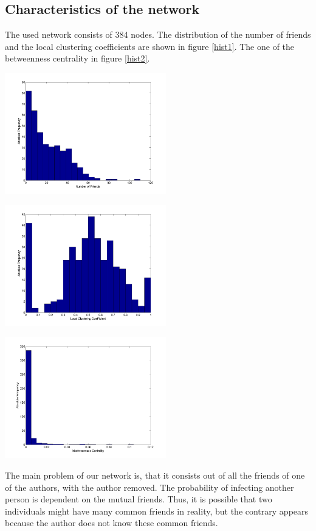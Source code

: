 
\subsection{Characteristics of the network}

The used network consists of 384 nodes. The distribution of the number of friends and the local clustering coefficients are shown in figure \ref{hist1}. The one of the betweenness centrality in figure \ref{hist2}.


\begin{minipage}{0.5\textwidth}
\includegraphics[width=7cm]{network_degreehist.png}
\end{minipage}
\begin{minipage}{0.5\textwidth}
\includegraphics[width=7cm]{network_clusterhist.png}
\end{minipage}
\label{hist1}
\begin{minipage}{0.5\textwidth}
\includegraphics[width=7cm]{network_centralityhist.png}
\label{hist2}
\end{minipage}
\newline
The main problem of our network is, that it consists out of all the friends of one of the authors, with the author removed. The probability of infecting another person is dependent on the mutual friends. Thus, it is possible that two individuals might have many common friends in reality, but the contrary appears because the author does not know these common friends.

